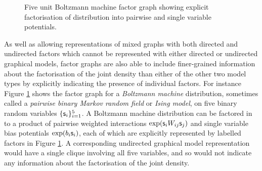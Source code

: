 \begin{figure}[!t]
\begin{tikzpicture}
\end{tikzpicture}
\caption[Boltzmann machine factor graph.]{Five unit Boltzmann machine factor graph showing explicit factorisation of distribution into pairwise and single variable potentials.}
\label{fig:boltzmann-machine-factor-graph}
\end{figure}

As well as allowing representations of mixed graphs with both directed and undirected factors which cannot be represented with either directed or undirected graphical models, factor graphs are also able to include finer-grained information about the factorisation of the joint density than either of the other two model types by explicitly indicating the presence of individual factors. For instance Figure \ref{fig:boltzmann-machine-factor-graph} shows the factor graph for a \emph{Boltzmann machine} distribution, sometimes called a \emph{pairwise binary Markov random field} or \emph{Ising model}, on five binary random variables $\lbrace \rvar{s}_i \rbrace_{i=1}^5$. A Boltzmann machine distribution can be factored in to a product of pairwise weighted interactions $\exp(\rvar{s}_i W_{ij} \rvar{s}_j)$ and single variable bias potentials $\exp(b_i \rvar{s}_i)$, each of which are explicitly represented by labelled factors in Figure \ref{fig:boltzmann-machine-factor-graph}. A corresponding undirected graphical model representation would have a single clique involving all five variables, and so would not indicate any information about the factorisation of the joint density.

